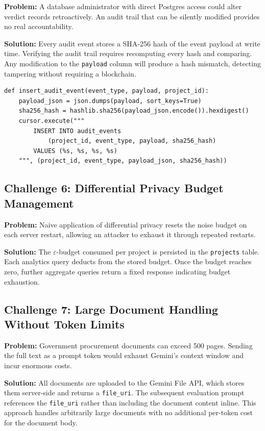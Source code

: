\documentclass[12pt,a4paper]{article}
\begin{document}
\textbf{Problem:} A database administrator with direct Postgres access could alter
verdict records retroactively. An audit trail that can be silently modified provides
no real accountability.

\textbf{Solution:} Every audit event stores a SHA-256 hash of the event payload at
write time. Verifying the audit trail requires recomputing every hash and comparing.
Any modification to the \texttt{payload} column will produce a hash mismatch,
detecting tampering without requiring a blockchain.

\begin{lstlisting}[style=pythonstyle, caption={Audit event insertion with hash}]
def insert_audit_event(event_type, payload, project_id):
    payload_json = json.dumps(payload, sort_keys=True)
    sha256_hash = hashlib.sha256(payload_json.encode()).hexdigest()
    cursor.execute("""
        INSERT INTO audit_events
            (project_id, event_type, payload, sha256_hash)
        VALUES (%s, %s, %s, %s)
    """, (project_id, event_type, payload_json, sha256_hash))
\end{lstlisting}

\subsection{Challenge 6: Differential Privacy Budget Management}

\textbf{Problem:} Naive application of differential privacy resets the noise budget
on each server restart, allowing an attacker to exhaust it through repeated restarts.

\textbf{Solution:} The $\varepsilon$-budget consumed per project is persisted in
the \texttt{projects} table. Each analytics query deducts from the stored budget.
Once the budget reaches zero, further aggregate queries return a fixed response
indicating budget exhaustion.

\subsection{Challenge 7: Large Document Handling Without Token Limits}

\textbf{Problem:} Government procurement documents can exceed 500 pages. Sending
the full text as a prompt token would exhaust Gemini's context window and incur
enormous costs.

\textbf{Solution:} All documents are uploaded to the Gemini File API, which stores
them server-side and returns a \texttt{file\_uri}. The subsequent evaluation prompt
references the \texttt{file\_uri} rather than including the document content inline.
This approach handles arbitrarily large documents with no additional per-token cost
for the document body.
\end{document}
